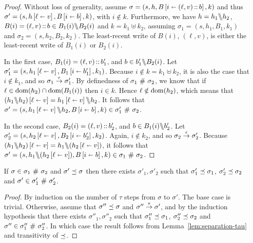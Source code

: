 \documentclass[11pt]{report}
\begin{document}
\begin{proof}
  Without loss of generality, assume $\sigma = (s,h,B \left[ i \shortleftarrow (\ell,v)\operatorname{:\!:} b \right],k)$ and thus $\sigma' = (s,h \left[ \ell \shortleftarrow v \right],B \left[ i \shortleftarrow b \right],k)$, with $i \notin k$. Furthermore, we have $h = h_1 \backslash\!\!\backslash h_2$, $B(i) = (\ell,v) \operatorname{:\!:} b \in B_1(i) \backslash\!\!\backslash B_2(i)$ and $k = k_1 \uplus k_2$, assuming $\sigma_1 = (s,h_1,B_1,k_1)$ and $\sigma_2 = (s,h_2,B_2,k_2)$. The least-recent write of $B(i)$, $(\ell,v)$, is either the least-recent write of $B_1(i)$ or $B_2(i)$. 

  In the first case, $B_1(i) = (\ell,v) \operatorname{:\!:} b_1'$, and $b \in b'_1 \backslash\!\!\backslash B_2(i)$. Let $\sigma'_1 = (s,h_1 \left[ \ell \shortleftarrow v \right],B_1 \left[ i \shortleftarrow b'_1 \right],k_1)$. Because $i \notin k = k_1 \uplus k_2$, it is also the case that $i \notin k_1$, and so $\sigma_1 \stackrel{\tau}{\rightarrow} \sigma'_1$. By definedness of $\sigma_1 \operatorname{\,\#\,} \sigma_2$, we know that if $\ell \in \operatorname{\mathrm{dom}}(h_2) \cap \operatorname{\mathrm{dom}}(B_1(i))$ then $i \in k$. Hence $\ell \notin \operatorname{\mathrm{dom}}(h_2)$, which means that $(h_1 \backslash\!\!\backslash h_2) \left[ \ell \shortleftarrow v \right] = h_1 \left[ \ell \shortleftarrow v \right] \backslash\!\!\backslash h_2$. It follows that $\sigma' = (s,h_1 \left[ \ell \shortleftarrow v \right] \backslash\!\!\backslash h_2, B \left[ i \shortleftarrow b \right],k) \in \sigma'_1 \operatorname{\,\#\,} \sigma_2$. 

  In the second case, $B_2(i) = (\ell,v) \operatorname{:\!:} b'_2$, and $b \in B_1(i) \backslash\!\!\backslash b'_2$. Let $\sigma'_2 = (s,h_2 \left[ \ell \shortleftarrow v \right],B_2 \left[ i \shortleftarrow b'_2 \right],k_2)$. Again, $i \notin k_2$, and so $\sigma_2 \stackrel{\tau}{\rightarrow} \sigma'_2$. Because $(h_1 \backslash\!\!\backslash h_2) \left[ \ell \shortleftarrow v \right] = h_1 \backslash\!\!\backslash (h_2 \left[ \ell \shortleftarrow v \right])$, it follows that $\sigma' = (s,h_1 \backslash\!\!\backslash (h_2 \left[ \ell \shortleftarrow v \right]),B \left[ i \shortleftarrow b \right],k) \in \sigma_1 \operatorname{\,\#\,} \sigma_2$. 
\end{proof}

\begin{lemma}
  \label{lem:separation-refinement}
  If $\sigma \in \sigma_1 \operatorname{\,\#\,} \sigma_2$ and $\sigma' \preceq \sigma$ then there exists $\sigma'_1,\sigma'_2$ such that $\sigma'_1 \preceq \sigma_1$, $\sigma'_2 \preceq \sigma_2$ and $\sigma' \in \sigma'_1 \operatorname{\,\#\,} \sigma'_2$. 
\end{lemma}

\begin{proof}
  By induction on the number of $\tau$ steps from $\sigma$ to $\sigma'$. The base case is trivial. Otherwise, assume that $\sigma'' \preceq \sigma$ and $\sigma'' \stackrel{\tau}{\rightarrow} \sigma'$, and by the induction hypothesis that there exists $\sigma''_1,\sigma''_2$ such that $\sigma''_1 \preceq \sigma_1$, $\sigma''_2 \preceq \sigma_2$ and $\sigma'' \in \sigma''_1 \operatorname{\,\#\,} \sigma''_2$. In which case the result follows from Lemma~\ref{lem:separation-tau} and transitivity of $\preceq$.
\end{proof}
\end{document}
